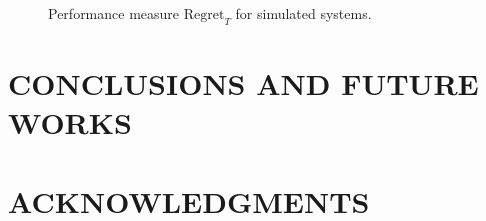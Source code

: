 \documentclass{article}
\begin{document}
\begin{figure}
{    \label{fig:PhysSysDisReg}}
    \caption{Performance measure $\text{Regret}_{T}$ for simulated systems.}
\end{figure}


\section{CONCLUSIONS AND FUTURE WORKS}

\section{ACKNOWLEDGMENTS}




\appendix
\end{document}

